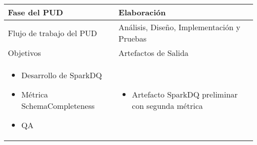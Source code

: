 \vspace{1cm}
\begin{tabular}{|p{}|p{}|}

\hline

\cellcolor[gray]{0.7}Fase del \acs{PUD} & Elaboración
 \\
\hline

\cellcolor[gray]{0.7}Flujo de trabajo del \acs{PUD} & Análisis, Diseño,
Implementación y Pruebas
 \\
\hline

\cellcolor[gray]{0.7}Objetivos  &
\cellcolor[gray]{0.7}Artefactos de Salida \\
\hline

\begin{itemize}
\item Desarrollo de SparkDQ
\item Métrica SchemaCompleteness
\item \acs{QA}
\end{itemize}

&

\begin{itemize}
\item Artefacto SparkDQ preliminar con segunda métrica
\end{itemize}
\\
\hline
\end{tabular}


